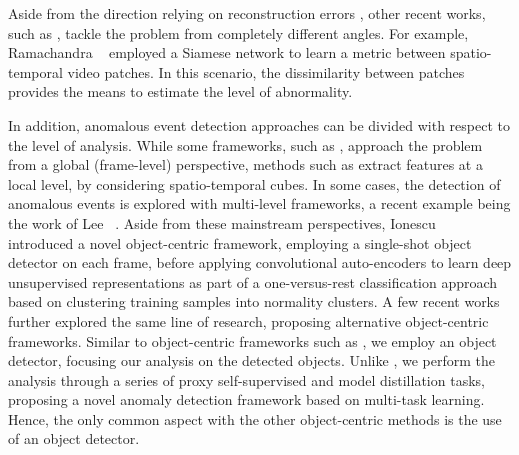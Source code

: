 \documentclass[final]{cvpr}
\begin{document}
Aside from the direction relying on reconstruction errors \cite{Hasan-CVPR-2016,Liu-CVPR-2018,Lu-ICCV-2013,Luo-ICCV-2017,Nguyen-ICCV-2019,Park-CVPR-2020,Ravanbakhsh-ICIP-2017,Tang-PRL-2020,Vu-AAAI-2019}, other recent works, such as \cite{Doshi-CVPRW-2020a,Ramachandra-WACV-2020b}, tackle the problem from completely different angles. For example, Ramachandra \etal~\cite{Ramachandra-WACV-2020b} employed a Siamese network to learn a metric between spatio-temporal video patches. In this scenario, the dissimilarity between patches provides the means to estimate the level of abnormality. 

In addition, anomalous event detection approaches can be divided with respect to the level of analysis. While some frameworks, such as \cite{Liu-CVPR-2018,Mehran-CVPR-2009,Ravanbakhsh-WACV-2018,Ravanbakhsh-ICIP-2017,Smeureanu-ICIAP-2017}, approach the problem from a global (frame-level) perspective, methods such as \cite{Giorno-ECCV-2016,Dutta-AAAI-2015,Kim-CVPR-2009,Ionescu-WACV-2019,Liu-BMVC-2018,Lu-ICCV-2013,Luo-ICCV-2017,Mahadevan-CVPR-2010,Sabokrou-IP-2017,Saligrama-CVPR-2012,Zhang-PR-2016} extract features at a local level, \eg by considering spatio-temporal cubes. In some cases, the detection of anomalous events is explored with multi-level frameworks, a recent example being the work of Lee \etal~\cite{Lee-TIP-2019}. Aside from these mainstream perspectives, Ionescu \etal~\cite{Ionescu-CVPR-2019} introduced a novel object-centric framework, employing a single-shot object detector on each frame, before applying convolutional auto-encoders to learn deep unsupervised representations as part of a one-versus-rest classification approach based on clustering training samples into normality clusters. A few recent works \cite{Doshi-CVPRW-2020a,Doshi-CVPRW-2020b,Yu-ACMMM-2020} further explored the same line of research, proposing alternative object-centric frameworks. Similar to object-centric frameworks such as \cite{Doshi-CVPRW-2020a,Doshi-CVPRW-2020b,Ionescu-CVPR-2019,Yu-ACMMM-2020}, we employ an object detector, focusing our analysis on the detected objects. Unlike \cite{Doshi-CVPRW-2020a,Doshi-CVPRW-2020b,Ionescu-CVPR-2019,Yu-ACMMM-2020}, we perform the analysis through a series of proxy self-supervised and model distillation tasks, proposing a novel anomaly detection framework based on multi-task learning. Hence, the only common aspect with the other object-centric methods \cite{Doshi-CVPRW-2020a,Doshi-CVPRW-2020b,Ionescu-CVPR-2019,Yu-ACMMM-2020} is the use of an object detector.
\end{document}
